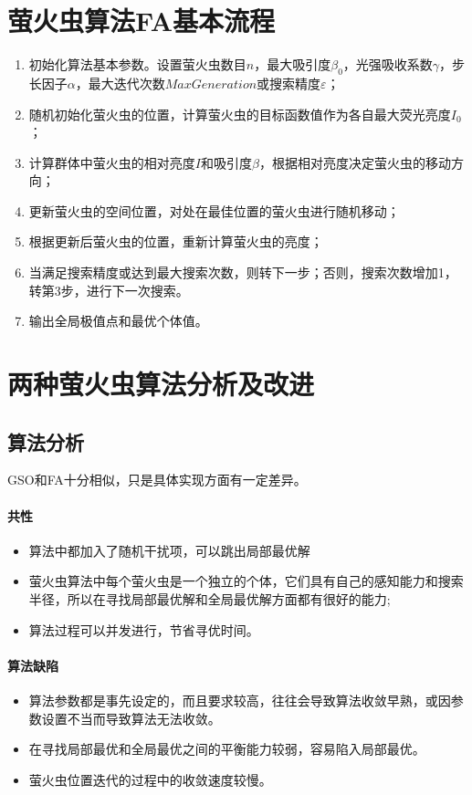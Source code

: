 \documentclass[UTF8]{ctexart}
\begin{document}
	\section{萤火虫算法FA基本流程}
\begin{enumerate}
\item 初始化算法基本参数。设置萤火虫数目$n$，最大吸引度$\beta_0$，光强吸收系数$\gamma$，步长因子$\alpha$，最大迭代次数$MaxGeneration$或搜索精度$\varepsilon$；
\item 随机初始化萤火虫的位置，计算萤火虫的目标函数值作为各自最大荧光亮度$I_0$；
\item 计算群体中萤火虫的相对亮度$I$和吸引度$\beta$，根据相对亮度决定萤火虫的移动方向；
\item 更新萤火虫的空间位置，对处在最佳位置的萤火虫进行随机移动；
\item 根据更新后萤火虫的位置，重新计算萤火虫的亮度；
\item 当满足搜索精度或达到最大搜索次数，则转下一步；否则，搜索次数增加1，转第3步，进行下一次搜索。
\item 输出全局极值点和最优个体值。
\end{enumerate}

	\section{两种萤火虫算法分析及改进}
		\subsection{算法分析}
			GSO和FA十分相似，只是具体实现方面有一定差异。
			\paragraph{共性}
				\begin{itemize}
                				\item{算法中都加入了随机干扰项，可以跳出局部最优解}
                				\item{萤火虫算法中每个萤火虫是一个独立的个体，它们具有自己的感知能力和搜索半径，所以在寻找局部最优解和全局最优解方面都有很好的能力;}
                				\item{算法过程可以并发进行，节省寻优时间。}
            			\end{itemize}
			\paragraph{算法缺陷}
				\begin{itemize}
                				\item{算法参数都是事先设定的，而且要求较高，往往会导致算法收敛早熟，或因参数设置不当而导致算法无法收敛。}
                				\item{在寻找局部最优和全局最优之间的平衡能力较弱，容易陷入局部最优。}
					\item{萤火虫位置迭代的过程中的收敛速度较慢。}
				\end{itemize}
\end{document}
